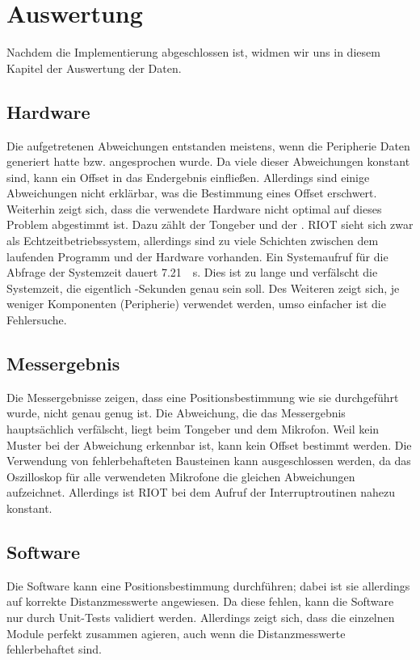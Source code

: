 \newpage
\section{Auswertung}

Nachdem die Implementierung abgeschlossen ist, widmen wir uns in diesem Kapitel der Auswertung der Daten.

\subsection{Hardware}
Die aufgetretenen Abweichungen entstanden meistens, wenn die Peripherie Daten generiert hatte bzw. angesprochen wurde. Da viele dieser Abweichungen konstant sind, kann ein Offset in das Endergebnis einfließen. Allerdings sind einige Abweichungen nicht erklärbar, was die Bestimmung eines Offset erschwert. Weiterhin zeigt sich, dass die verwendete Hardware nicht optimal auf dieses Problem abgestimmt ist. Dazu zählt der Tongeber und der \microphone . RIOT sieht sich zwar als Echtzeitbetriebssystem, allerdings sind zu viele Schichten zwischen dem laufenden Programm und der Hardware vorhanden. Ein Systemaufruf für die Abfrage der Systemzeit dauert \SI{7,21}{\mu s}. Dies ist zu lange und verfälscht die Systemzeit, die eigentlich \si{\mu}-Sekunden genau sein soll. Des Weiteren zeigt sich, je weniger Komponenten (Peripherie) verwendet werden, umso einfacher ist die Fehlersuche.

\subsection{Messergebnis}
Die Messergebnisse zeigen, dass eine Positionsbestimmung wie sie durchgeführt wurde, nicht genau genug ist. Die Abweichung, die das Messergebnis hauptsächlich verfälscht, liegt beim Tongeber und dem Mikrofon. Weil kein Muster bei der Abweichung erkennbar ist, kann kein Offset bestimmt werden. Die Verwendung von fehlerbehafteten Bausteinen kann ausgeschlossen werden, da das Oszilloskop für alle verwendeten Mikrofone die gleichen Abweichungen aufzeichnet. Allerdings ist RIOT bei dem Aufruf der Interruptroutinen nahezu konstant.

\subsection{Software}
Die Software kann eine Positionsbestimmung durchführen; dabei ist sie allerdings auf korrekte Distanzmesswerte angewiesen. Da diese fehlen, kann die Software nur durch Unit-Tests validiert werden. Allerdings zeigt sich, dass die einzelnen Module perfekt zusammen agieren, auch wenn die Distanzmesswerte fehlerbehaftet sind.

